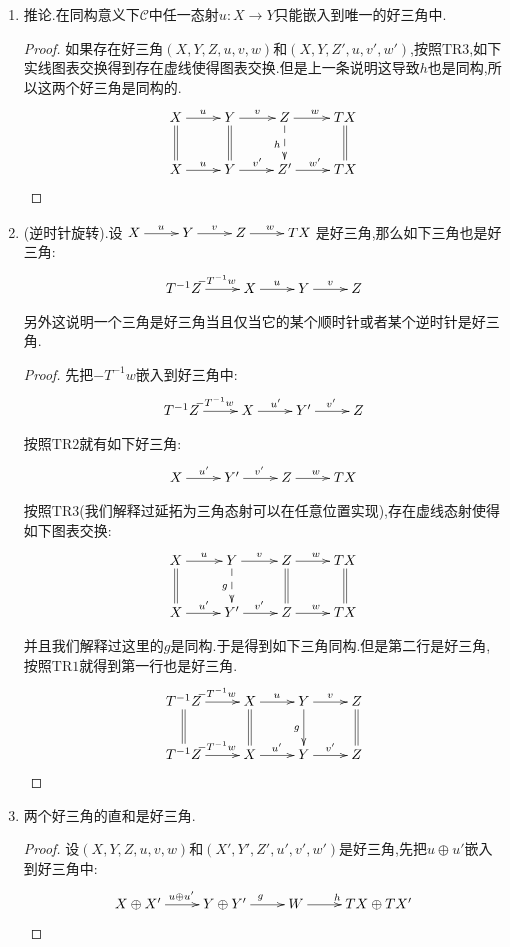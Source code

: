 \begin{enumerate}
\begin{proof}
    	按照五引理,这里的$h_*$也是同构,于是存在态射$h_1:Z'\to Z$使得$hh_1=1_{Z'}$.同理对原本的好三角之间的态射作用上同调函子$\mathrm{Hom}_{\mathscr{C}}(Z,-)$,得到存在态射$h_2:Z'\to Z$使得$h_2h=1_Z$.于是得到$h:Z\to Z'$是同构.
    \end{proof}
    \item 推论.在同构意义下$\mathscr{C}$中任一态射$u:X\to Y$只能嵌入到唯一的好三角中.
    \begin{proof}
    	
    	如果存在好三角$(X,Y,Z,u,v,w)$和$(X,Y,Z',u,v',w')$,按照$\mathrm{TR}3$,如下实线图表交换得到存在虚线使得图表交换.但是上一条说明这导致$h$也是同构,所以这两个好三角是同构的.
    	$$\xymatrix{X\ar[r]^u\ar@{=}[d]&Y\ar[r]^v\ar@{=}[d]&Z\ar[r]^w\ar@{-->}[d]_h&TX\ar@{=}[d]\\X\ar[r]^u&Y\ar[r]^{v'}&Z'\ar[r]^{w'}&TX}$$
    \end{proof}
    \item (逆时针旋转).设$\xymatrix{X\ar[r]^u&Y\ar[r]^v&Z\ar[r]^w&TX}$是好三角,那么如下三角也是好三角:
    $$\xymatrix{T^{-1}Z\ar[r]^{-T^{-1}w}&X\ar[r]^u&Y\ar[r]^v&Z}$$
    
    另外这说明一个三角是好三角当且仅当它的某个顺时针或者某个逆时针是好三角.
    \begin{proof}
    	
    	先把$-T^{-1}w$嵌入到好三角中:
    	$$\xymatrix{T^{-1}Z\ar[r]^{-T^{-1}w}&X\ar[r]^{u'}&Y'\ar[r]^{v'}&Z}$$
    	
    	按照$\mathrm{TR}2$就有如下好三角:
    	$$\xymatrix{X\ar[r]^{u'}&Y'\ar[r]^{v'}&Z\ar[r]^w&TX}$$
    	
    	按照$\mathrm{TR}3$(我们解释过延拓为三角态射可以在任意位置实现),存在虚线态射使得如下图表交换:
    	$$\xymatrix{X\ar[r]^u\ar@{=}[d]&Y\ar[r]^v\ar@{-->}[d]_g&Z\ar[r]^w\ar@{=}[d]&TX\ar@{=}[d]\\X\ar[r]^{u'}&Y'\ar[r]^{v'}&Z\ar[r]^w&TX}$$
    	
    	并且我们解释过这里的$g$是同构.于是得到如下三角同构.但是第二行是好三角,按照$\mathrm{TR}1$就得到第一行也是好三角.
    	$$\xymatrix{T^{-1}Z\ar[r]^{-T^{-1}w}\ar@{=}[d]&X\ar[r]^u\ar@{=}[d]&Y\ar[r]^v\ar[d]_g&Z\ar@{=}[d]\\T^{-1}Z\ar[r]^{-T^{-1}w}&X\ar[r]^{u'}&Y\ar[r]^{v'}&Z}$$
    \end{proof}
    \item 两个好三角的直和是好三角.
    \begin{proof}
    	
    	设$(X,Y,Z,u,v,w)$和$(X',Y',Z',u',v',w')$是好三角,先把$u\oplus u'$嵌入到好三角中:
    	$$\xymatrix{X\oplus X'\ar[r]^{u\oplus u'}&Y\oplus Y'\ar[r]^g&W\ar[r]^h&TX\oplus TX'}$$
    	

\end{proof}
\end{enumerate}
